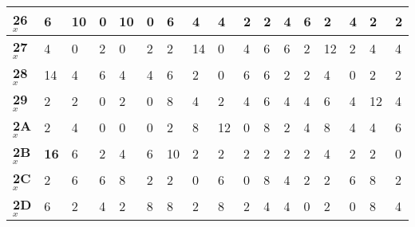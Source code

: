 \begin{longtable}[c]{|l|l|l|l|l|l|l|l|l|l|l|l|l|l|l|l|l|}
\textbf{26$_x$} & 6              & 10             & 0              & 10             & 0              & 6              & 4              & 4              & 2              & 2              & 4              & 6              & 2              & 4              & 2              & 2              \\ \hline
\textbf{27$_x$} & 4              & 0              & 2              & 0              & 2              & 2              & 14             & 0              & 4              & 6              & 6              & 2              & 12             & 2              & 4              & 4              \\ \hline
\textbf{28$_x$} & 14             & 4              & 6              & 4              & 4              & 6              & 2              & 0              & 6              & 6              & 2              & 2              & 4              & 0              & 2              & 2              \\ \hline
\textbf{29$_x$} & 2              & 2              & 0              & 2              & 0              & 8              & 4              & 2              & 4              & 6              & 4              & 4              & 6              & 4              & 12             & 4              \\ \hline
\textbf{2A$_x$} & 2              & 4              & 0              & 0              & 0              & 2              & 8              & 12             & 0              & 8              & 2              & 4              & 8              & 4              & 4              & 6              \\ \hline
\textbf{2B$_x$} & \textbf{16}             & 6              & 2              & 4              & 6              & 10             & 2              & 2              & 2              & 2              & 2              & 2              & 4              & 2              & 2              & 0              \\ \hline
\textbf{2C$_x$} & 2              & 6              & 6              & 8              & 2              & 2              & 0              & 6              & 0              & 8              & 4              & 2              & 2              & 6              & 8              & 2              \\ \hline
\textbf{2D$_x$} & 6              & 2              & 4              & 2              & 8              & 8              & 2              & 8              & 2              & 4              & 4              & 0              & 2              & 0              & 8              & 4              \\ \hline

\end{longtable}
